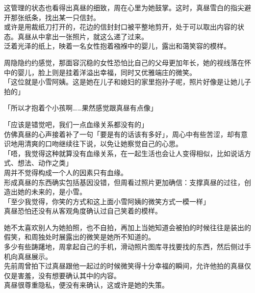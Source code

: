 这管理的状态也看得出真昼的细致，周在心里为她鼓掌。这时，真昼雪白的指尖避开那张纸条，找出某一只信封。\\

或许是用裁纸刀打开的，花边的信封封口被平整地剪开，处于可以取出内容的状态。真昼从中拿出一张照片，就这么递了过来。\\

泛着光泽的纸上，映着一名女性抱着襁褓中的婴儿，露出和蔼笑容的模样。

周隐隐约约感觉，那面容沉稳的女性恐怕比自己的父母更加年长，她的视线落在怀中的婴儿，脸上则是挂着洋溢出幸福，同时又优雅端庄的微笑。\\

「这位就是小雪阿姨。这是她在儿子和媳妇的家里抱孙子呢，照片好像是让她儿子拍的」

「所以才抱着个小孩啊……果然感觉跟真昼有点像」

「应该是错觉吧，我们一点血缘关系都没有的」\\

仿佛真昼的心声接着补了一句「要是有的话该有多好」，周心中有些苦涩，却有意识地用清爽的口吻继续往下说，以免让她察觉自己的心思。\\

「唔，我觉得这种就算没有血缘关系，在一起生活也会让人变得相似，比如说话方式、想法、动作之类」\\

周并不觉得构成一个人的因素只有血缘。\\

形成真昼的东西确实包括基因没错，但周看过照片更加确信：支撑真昼的过往，创造出她的未来的，是小雪。\\

「至少我觉得，你笑的方式和这上面小雪阿姨的微笑方式一模一样」\\

真昼恐怕还没有从客观角度确认过自己笑着的模样。

她不太喜欢别人为她拍照，也不自拍，再加上当她知道会被拍的时候往往是装出的假笑，和周独处时展露出的微笑是她所不知道的。\\

多少有些踌躇地，周拿起自己的手机，滑动照片图库寻找要找的东西，然后侧过手机向真昼展示。\\

先前周曾拍下过真昼跟他一起过的时候微笑得十分幸福的瞬间，允许他拍的真昼仅仅是害羞，没有想要确认其中的内容。\\

真昼很尊重隐私，便没有来确认，这或许是她的失策。\\

